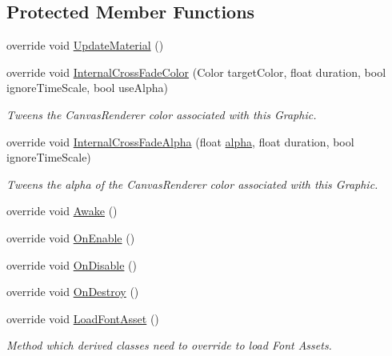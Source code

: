 \subsection*{Protected Member Functions}
\begin{DoxyCompactItemize}
\item 
override void \mbox{\hyperlink{class_t_m_pro_1_1_text_mesh_pro_u_g_u_i_ab4ae70c3573369f058130f459a4df34d}{Update\+Material}} ()
\item 
override void \mbox{\hyperlink{class_t_m_pro_1_1_text_mesh_pro_u_g_u_i_aaab93e2d40e730d419c60310f0b55605}{Internal\+Cross\+Fade\+Color}} (Color target\+Color, float duration, bool ignore\+Time\+Scale, bool use\+Alpha)
\begin{DoxyCompactList}\small\item\em Tweens the Canvas\+Renderer color associated with this Graphic. \end{DoxyCompactList}\item 
override void \mbox{\hyperlink{class_t_m_pro_1_1_text_mesh_pro_u_g_u_i_a198b9bf0fea8a41b2c76259db7f5baff}{Internal\+Cross\+Fade\+Alpha}} (float \mbox{\hyperlink{class_t_m_pro_1_1_t_m_p___text_aca56e662ce122bb749faa1b044f29a57}{alpha}}, float duration, bool ignore\+Time\+Scale)
\begin{DoxyCompactList}\small\item\em Tweens the alpha of the Canvas\+Renderer color associated with this Graphic. \end{DoxyCompactList}\item 
override void \mbox{\hyperlink{class_t_m_pro_1_1_text_mesh_pro_u_g_u_i_a68396208120ce895ce53db26b8779c35}{Awake}} ()
\item 
override void \mbox{\hyperlink{class_t_m_pro_1_1_text_mesh_pro_u_g_u_i_aa7530af860a3f8775e4b0abe97275478}{On\+Enable}} ()
\item 
override void \mbox{\hyperlink{class_t_m_pro_1_1_text_mesh_pro_u_g_u_i_aff61001f3c6f4c13de8208a487e7061a}{On\+Disable}} ()
\item 
override void \mbox{\hyperlink{class_t_m_pro_1_1_text_mesh_pro_u_g_u_i_a48779da83c94351d0994aac6461bda96}{On\+Destroy}} ()
\item 
override void \mbox{\hyperlink{class_t_m_pro_1_1_text_mesh_pro_u_g_u_i_aedbf6c9aaf6c104ac7c81e85d99498b4}{Load\+Font\+Asset}} ()
\begin{DoxyCompactList}\small\item\em Method which derived classes need to override to load Font Assets. \end{DoxyCompactList}\item 

\end{DoxyCompactItemize}
